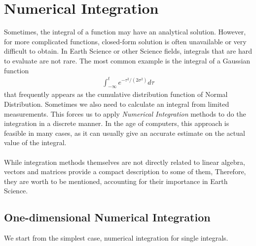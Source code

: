 \chapter{Numerical Integration}

Sometimes, the integral of a function may have an analytical solution. However, for more complicated functions, closed-form solution is often unavailable or very difficult to obtain. In Earth Science or other Science fields, integrals that are hard to evaluate are not rare. The most common example is the integral of a Gaussian function
\begin{align*}
\int_{-\infty}^{t} e^{-\tau^2/(2\sigma^2)} d\tau
\end{align*}
that frequently appears as the cumulative distribution function of Normal Distribution. Sometimes we also need to calculate an integral from limited measurements. This forces us to apply \textit{Numerical Integration} methods to do the integration in a discrete manner. In the age of computers, this approach is feasible in many cases, as it can usually give an accurate estimate on the actual value of the integral.\\
\\
While integration methods themselves are not directly related to linear algebra, vectors and matrices provide a compact description to some of them, Therefore, they are worth to be mentioned, accounting for their importance in Earth Science.

\section{One-dimensional Numerical Integration}
We start from the simplest case, numerical integration for single integrals.

